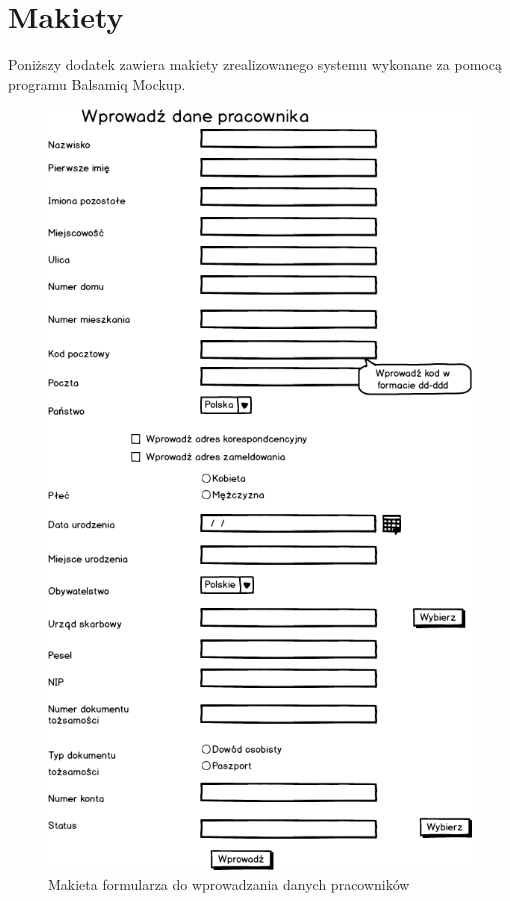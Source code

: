 \chapter{Makiety}
\label{makiety}
Poniższy dodatek zawiera makiety zrealizowanego systemu wykonane za pomocą programu Balsamiq Mockup.


\begin{figure}[tdh]
    \begin{center}
	\includegraphics[scale=.6 ]{img/mockup.png}
	\caption{Makieta formularza do wprowadzania danych pracowników}
	\label{makieta}
    \end{center}
\end{figure}

